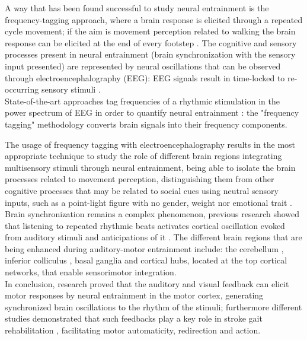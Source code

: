 A way that has been found successful to study neural entrainment is the frequency-tagging approach, where a brain response is elicited through a repeated cycle movement; if the aim is movement perception related to walking the brain response can be elicited at the end of every footstep \parencite{Cracco_2022}. The cognitive and sensory processes present in neural entrainment (brain synchronization with the sensory input presented) are represented by neural oscillations that can be observed through electroencephalography (EEG): EEG signals result in time-locked to re-occurring sensory stimuli \parencite{Thut_2012}. \\
State-of-the-art approaches tag frequencies of a rhythmic stimulation in the power spectrum of EEG in order to quantify neural entrainment \parencite{Nozaradan_2011}: the "frequency tagging" methodology converts brain signals into their frequency components. 

The usage of frequency tagging with electroencephalography results in the most appropriate technique to study the role of different brain regions integrating multisensory stimuli through neural entrainment, being able to isolate the brain processes related to movement perception, distinguishing them from other cognitive processes that may be related to social cues using neutral sensory inputs, such as a point-light figure with no gender, weight nor emotional trait \parencite{Cracco_2022}. \\
Brain synchronization remains a complex phenomenon, previous research showed that listening to repeated rhythmic beats activates cortical oscillation evoked from auditory stimuli and anticipations of it \parencite{Snyder_2005}. The different brain regions that are being enhanced during auditory-motor entrainment include: the cerebellum \parencite{Grahn_2011}, inferior colliculus \parencite{Tierney_2013}, basal ganglia \parencite{Thaut_2009} and cortical hubs, located at the top cortical networks, that enable sensorimotor integration. \\
In conclusion, research proved that the auditory and visual feedback can elicit motor responses by neural entrainment in the motor cortex, generating synchronized brain oscillations to the rhythm of the stimuli; furthermore different studies demonstrated that such feedbacks play a key role in stroke gait rehabilitation \parencite{Chen_2018,Bolognini_2016}, facilitating motor automaticity, redirection and action. 

